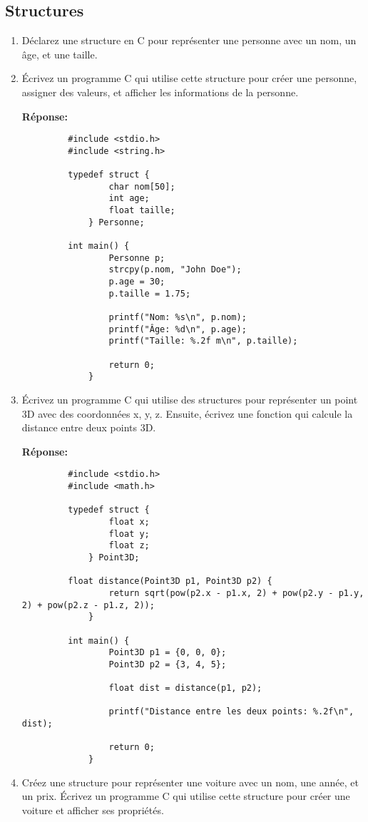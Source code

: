 \subsection{Structures}
\begin{enumerate}
	\item Déclarez une structure en C pour représenter une personne avec un nom, un âge, et une taille.
	\item Écrivez un programme C qui utilise cette structure pour créer une personne, assigner des valeurs, et afficher les informations de la personne.
	
	 \textbf{Réponse:}
	 \begin{lstlisting}
		 #include <stdio.h>
		 #include <string.h>
		
		 typedef struct {
			     char nom[50];
			     int age;
			     float taille;
			 } Personne;
		
		 int main() {
			     Personne p;
			     strcpy(p.nom, "John Doe");
			     p.age = 30;
			     p.taille = 1.75;
			
			     printf("Nom: %s\n", p.nom);
			     printf("Âge: %d\n", p.age);
			     printf("Taille: %.2f m\n", p.taille);
			
			     return 0;
			 }
		 \end{lstlisting}
	
	\item Écrivez un programme C qui utilise des structures pour représenter un point 3D avec des coordonnées x, y, z. Ensuite, écrivez une fonction qui calcule la distance entre deux points 3D.
	
	 \textbf{Réponse:}
	 \begin{lstlisting}
		 #include <stdio.h>
		 #include <math.h>
		
		 typedef struct {
			     float x;
			     float y;
			     float z;
			 } Point3D;
		
		 float distance(Point3D p1, Point3D p2) {
			     return sqrt(pow(p2.x - p1.x, 2) + pow(p2.y - p1.y, 2) + pow(p2.z - p1.z, 2));
			 }
		
		 int main() {
			     Point3D p1 = {0, 0, 0};
			     Point3D p2 = {3, 4, 5};
			
			     float dist = distance(p1, p2);
			
			     printf("Distance entre les deux points: %.2f\n", dist);
			
			     return 0;
			 }
		 \end{lstlisting}
	
	\item Créez une structure pour représenter une voiture avec un nom, une année, et un prix. Écrivez un programme C qui utilise cette structure pour créer une voiture et afficher ses propriétés.


\end{enumerate}
